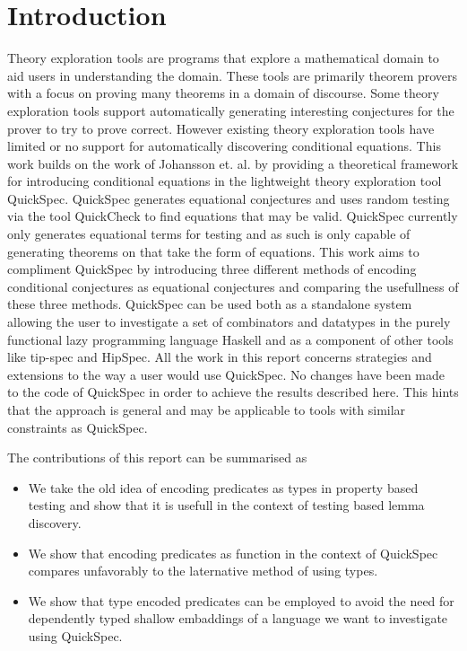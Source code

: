 \section{Introduction}
Theory exploration tools are programs that
explore a mathematical domain to aid users in
understanding the domain. %
These tools are primarily theorem provers with a focus
on proving many theorems in a domain of discourse.
Some theory exploration tools support automatically generating
interesting conjectures for the prover to try to prove correct.
However existing theory exploration tools have limited or no
support for automatically discovering conditional equations. %
This work builds on the work of Johansson et. al. %
by providing a theoretical framework for introducing conditional
equations in the lightweight theory exploration tool QuickSpec. %
QuickSpec generates equational conjectures and uses random testing via the tool QuickCheck %
to find equations that may be valid. QuickSpec currently only generates
equational terms for testing and as such is only capable of generating
theorems on that take the form of equations. 
This work aims to compliment QuickSpec by introducing three different methods
of encoding conditional conjectures as equational conjectures and comparing
the usefullness of these three methods. QuickSpec can be used both as a standalone
system allowing the user to investigate a set of combinators and datatypes in the
purely functional lazy programming language Haskell and as a component of other tools %
like tip-spec and HipSpec. %
All the work in this report concerns strategies and extensions to the way a user would
use QuickSpec. No changes have been made to the code of QuickSpec in order to
achieve the results described here. This hints that the approach is general
and may be applicable to tools with similar constraints as QuickSpec.

The contributions of this report can be summarised as
\begin{itemize}
    \item We take the old idea of encoding predicates as types
        in property based testing and show that it is usefull in
        the context of testing based lemma discovery.

    \item We show that encoding predicates as function in the context
        of QuickSpec compares unfavorably to the laternative method
        of using types.

    \item We show that type encoded predicates can be employed to avoid 
        the need for dependently typed shallow embaddings of a language
        we want to investigate using QuickSpec.
\end{itemize}
